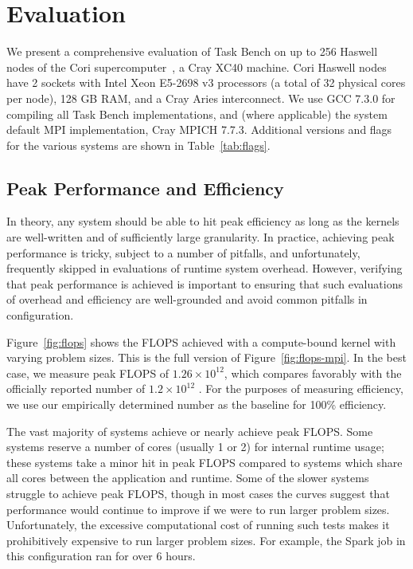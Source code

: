 \section{Evaluation}
\label{sec:evaluation}



We present a comprehensive evaluation of Task Bench on up to 256
Haswell nodes of the Cori supercomputer~\cite{Cori}, a Cray XC40
machine. Cori Haswell nodes have 2 sockets with Intel Xeon E5-2698 v3
processors (a total of 32 physical cores per node), 128 GB RAM, and a
Cray Aries interconnect. We use GCC 7.3.0 for compiling all Task Bench
implementations, and (where applicable) the system default MPI
implementation, Cray MPICH 7.7.3. Additional versions and flags for the
various systems are shown in Table~\ref{tab:flags}.

\subsection{Peak Performance and Efficiency}
\label{subsec:peak-performance-and-efficiency}






In theory, any system should be able to hit peak efficiency as long as
the kernels are well-written and of sufficiently large granularity. In
practice, achieving peak performance is tricky, subject to a number of
pitfalls, and unfortunately, frequently skipped in evaluations of
runtime system overhead. However, verifying that peak performance is
achieved is important to ensuring that such evaluations of overhead and
efficiency are well-grounded and avoid common pitfalls in
configuration.

Figure~\ref{fig:flops} shows the FLOPS achieved with a compute-bound
kernel with varying problem sizes. This is the full version of
Figure~\ref{fig:flops-mpi}. In the best case, we measure peak FLOPS of
$1.26 \times 10^{12}$, which compares favorably with the officially
reported number of $1.2 \times 10^{12}$ \cite{Cori}. For the purposes
of measuring efficiency, we use our empirically determined number as
the baseline for 100\% efficiency.

The vast majority of systems achieve or nearly achieve peak FLOPS. Some
systems reserve a number of cores (usually 1 or 2) for internal
runtime usage; these systems take a minor hit in peak FLOPS compared
to systems which share all cores between the application and runtime. Some of the
slower systems struggle to achieve peak FLOPS, though in most cases
the curves suggest that performance would continue to improve if we
were to run larger problem sizes. Unfortunately, the excessive
computational cost of running such tests makes it prohibitively
expensive to run larger problem sizes. For example, the Spark job in
this configuration ran for over 6 hours.

